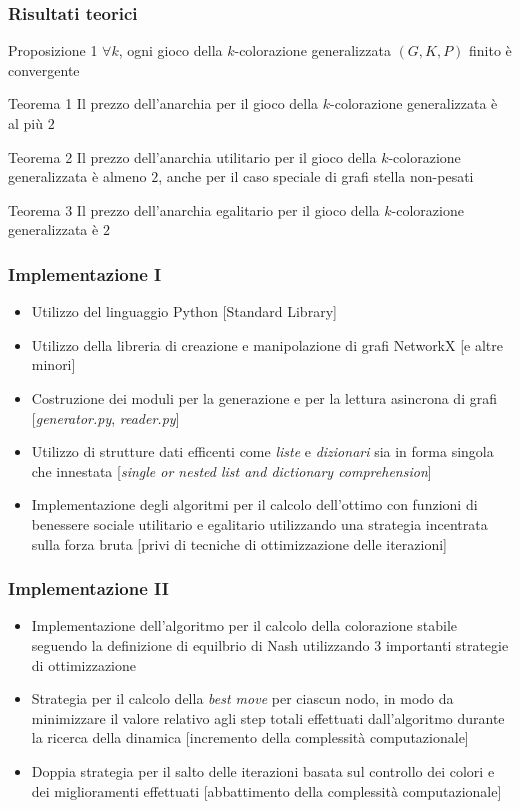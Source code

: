 \documentclass{beamer}
\begin{document}
\begin{frame}
\frametitle{Risultati teorici}
	\begin{alertblock}{Proposizione 1}
		$\forall k$, ogni gioco della $k$-colorazione generalizzata $(G,K,P)$ finito è convergente
	\end{alertblock}
	\begin{alertblock}{Teorema 1}
		Il prezzo dell'anarchia per il gioco della $k$-colorazione generalizzata è al più $2$ 
	\end{alertblock}	
	\begin{alertblock}{Teorema 2}
		Il prezzo dell'anarchia utilitario per il gioco della $k$-colorazione generalizzata è almeno $2$, anche per il caso speciale di grafi stella non-pesati
	\end{alertblock}	
	\begin{alertblock}{Teorema 3}
		Il prezzo dell'anarchia egalitario per il gioco della $k$-colorazione generalizzata è $2$ 
	\end{alertblock}	
\end{frame}


\begin{frame}
\frametitle{Implementazione I}
\begin{itemize}
	\item Utilizzo del linguaggio \alert{Python} [Standard Library]
	\item Utilizzo della libreria di creazione e manipolazione di grafi \alert{NetworkX} [e altre minori]
	\item Costruzione dei moduli per la generazione e per la lettura asincrona di grafi [\textit{generator.py}, \textit{reader.py}]
	\item Utilizzo di \alert{strutture dati} efficenti come \textit{liste} e \textit{dizionari} sia in forma singola che innestata [\textit{single or nested list and dictionary comprehension}]
	\item Implementazione degli \alert{algoritmi per il calcolo dell'ottimo} con funzioni di benessere sociale utilitario e egalitario utilizzando una strategia incentrata sulla forza bruta [privi di tecniche di ottimizzazione delle iterazioni]
\end{itemize}
\end{frame}


\begin{frame}
\frametitle{Implementazione II}
\begin{itemize}
	\item Implementazione dell'\alert{algoritmo per il calcolo della colorazione stabile} seguendo la definizione di equilbrio di Nash utilizzando 3 importanti strategie di ottimizzazione
	\item Strategia per il calcolo della \textit{\alert{best move}} per ciascun nodo, in modo da minimizzare il valore relativo agli step totali effettuati dall'algoritmo durante la ricerca della dinamica [incremento della complessità computazionale]
	\item Doppia strategia per il salto delle iterazioni basata sul controllo dei colori e dei miglioramenti effettuati [abbattimento della complessità computazionale]
\end{itemize}
\end{frame}
\end{document}
